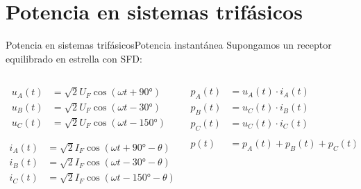 \documentclass[aspectratio=169, xcolor={usenames,svgnames,dvipsnames}]{beamer}
\begin{document}
\section{Potencia en sistemas trifásicos}

\begin{frame}{Potencia en sistemas trifásicos}{Potencia instantánea}
Supongamos un receptor equilibrado en estrella con SFD:

\begin{columns}
\begin{column}{0.5\columnwidth}
\begin{align*}
  u_A(t) &= \sqrt{2} U_F \cos(\omega t + \ang{90})\\
  u_B(t) &= \sqrt{2} U_F \cos(\omega t - \ang{30})\\
  u_C(t) &= \sqrt{2} U_F \cos(\omega t - \ang{150})
\end{align*}

\begin{align*}
  i_A(t) &= \sqrt{2} I_F \cos(\omega t + \ang{90} - \theta)\\
  i_B(t) &= \sqrt{2} I_F \cos(\omega t - \ang{30} - \theta)\\
  i_C(t) &= \sqrt{2} I_F \cos(\omega t - \ang{150} - \theta)
\end{align*}
\end{column}

\begin{column}{0.5\columnwidth}
\begin{align*}
  p_A(t) &= u_A(t) \cdot i_A(t)\\
  p_B(t) &= u_C(t) \cdot i_B(t)\\
  p_C(t) &= u_C(t) \cdot i_C(t)\\
  \\
  p(t) &= p_A(t) + p_B(t) + p_C(t)
\end{align*}
\end{column}
\end{columns}
\end{frame}
\end{document}
